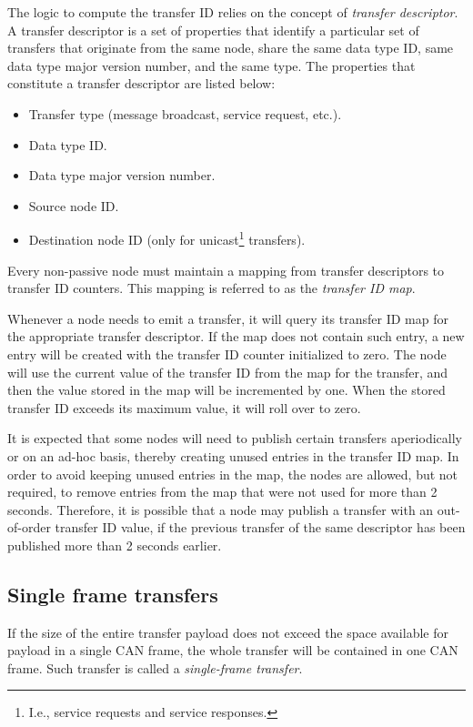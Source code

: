 The logic to compute the transfer ID relies on the concept of \emph{transfer descriptor}.
A transfer descriptor is a set of properties that identify a particular set of transfers that originate
from the same node, share the same data type ID, same data type major version number, and the same type.
The properties that constitute a transfer descriptor are listed below:
\begin{itemize}
    \item Transfer type (message broadcast, service request, etc.).
    \item Data type ID.
    \item Data type major version number.
    \item Source node ID.
    \item Destination node ID (only for unicast\footnote{I.e., service requests and service responses.} transfers).
\end{itemize}

Every non-passive node must maintain a mapping from transfer descriptors to transfer ID counters.
This mapping is referred to as the \emph{transfer ID map}.

Whenever a node needs to emit a transfer, it will query its transfer ID map for the appropriate transfer descriptor.
If the map does not contain such entry, a new entry will be created with the transfer ID counter initialized to zero.
The node will use the current value of the transfer ID from the map for the transfer,
and then the value stored in the map will be incremented by one.
When the stored transfer ID exceeds its maximum value, it will roll over to zero.

It is expected that some nodes will need to publish certain transfers aperiodically or on an ad-hoc basis,
thereby creating unused entries in the transfer ID map.
In order to avoid keeping unused entries in the map, the nodes are allowed, but not required,
to remove entries from the map that were not used for more than 2 seconds.
Therefore, it is possible that a node may publish a transfer with an out-of-order transfer ID value,
if the previous transfer of the same descriptor has been published more than 2 seconds earlier.

\subsection{Single frame transfers}

If the size of the entire transfer payload does not exceed the space available for payload in a single CAN frame,
the whole transfer will be contained in one CAN frame.
Such transfer is called a \emph{single-frame transfer}.

